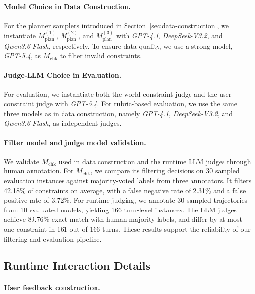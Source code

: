 \paragraph{Model Choice in Data Construction.}
For the planner samplers introduced in Section~\ref{sec:data-construction}, we instantiate
$M_{\mathrm{plan}}^{(1)}$, $M_{\mathrm{plan}}^{(2)}$, and $M_{\mathrm{plan}}^{(3)}$
with \textit{GPT-4.1}, \textit{DeepSeek-V3.2}, and \textit{Qwen3.6-Flash},
respectively. To ensure data quality, we use a strong model, \textit{GPT-5.4}, as
$M_{\mathrm{chk}}$ to filter invalid constraints.

\paragraph{Judge-LLM Choice in Evaluation.}
For evaluation, we instantiate both the world-constraint judge and the user-constraint judge
with \textit{GPT-5.4}. 
For rubric-based evaluation, we use the same three models as in
data construction, namely \textit{GPT-4.1}, \textit{DeepSeek-V3.2}, and
\textit{Qwen3.6-Flash}, as independent judges.


\paragraph{Filter model and judge model validation.}
We validate $M_{\mathrm{chk}}$ used in data construction and the runtime LLM judges through human annotation. For $M_{\mathrm{chk}}$, we compare its filtering decisions on 30 sampled evaluation instances against majority-voted labels from three annotators. It filters 42.18\% of constraints on average, with a false negative rate of 2.31\% and a false positive rate of 3.72\%. For runtime judging, we annotate 30 sampled trajectories from 10 evaluated models, yielding 166 turn-level instances. The LLM judges achieve 89.76\% exact match with human majority labels, and differ by at most one constraint in 161 out of 166 turns. These results support the reliability of our filtering and evaluation pipeline.



\subsection{Runtime Interaction Details}
\label{app:runtime-interaction-details}


\paragraph{User feedback construction.}

